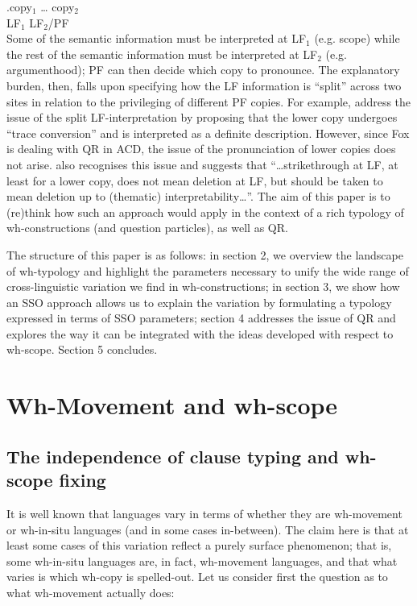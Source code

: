 \documentclass{glossa}
\begin{document}
\exg.\label{intro40}copy$_1$ {\dots} copy$_2$\\
   LF$_1$ {} LF$_2$/PF\\

Some of the semantic information must be interpreted at LF$_1$ (e.g. scope) while the rest of the semantic information must be interpreted at LF$_2$ (e.g. argumenthood); PF can then decide which copy to pronounce. The explanatory burden, then, falls upon specifying how the LF information is ``split'' across two sites in relation to the privileging of different PF copies. For example, \cite{fox:2002} address the issue of the split LF-interpretation by proposing that the lower copy undergoes ``trace conversion'' and is interpreted as a definite description. However, since Fox is dealing with QR in ACD, the issue of the pronunciation of lower copies does not arise. \cite{bobaljik:2002} also recognises this issue and suggests that ``\dots strikethrough at LF, at least for a lower copy, does not mean deletion at LF, but should be taken to mean deletion up to (thematic) interpretability\dots ''. The aim of this paper is to (re)think how such an approach would apply in the context of a rich typology of wh-constructions (and question particles), as well as QR.

The structure of this paper is as follows: in section 2, we overview the landscape of wh-typology and highlight the parameters necessary to unify the wide range of cross-linguistic variation we find in wh-constructions; in section 3, we show how an SSO approach allows us to explain the variation by formulating a typology expressed in terms of SSO parameters; section 4 addresses the issue of QR and explores the way it can be integrated with the ideas developed with respect to wh-scope. Section 5 concludes.


\section{Wh-Movement and wh-scope}
\subsection{The independence of clause typing and wh-scope fixing}
It is well known that languages vary in terms of whether they are wh-movement or wh-in-situ languages (and in some cases in-between). The claim here is that at least some cases of this variation reflect a purely surface phenomenon; that is, some wh-in-situ languages are, in fact, wh-movement languages, and that what varies is which wh-copy is spelled-out. Let us consider first the question as to what wh-movement actually does:
\end{document}
